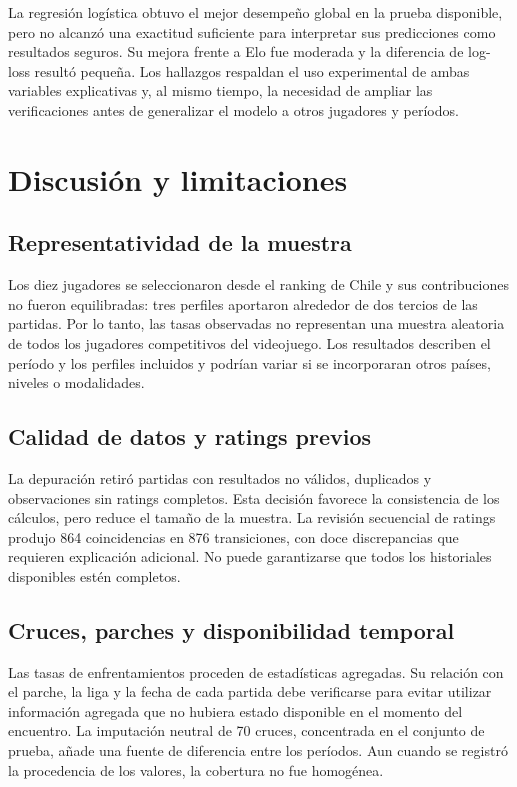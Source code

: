 \documentclass[12pt,a4paper]{article}
\begin{document}
La regresión logística obtuvo el mejor desempeño global en la prueba disponible, pero no alcanzó una exactitud suficiente para interpretar sus predicciones como resultados seguros. Su mejora frente a Elo fue moderada y la diferencia de log-loss resultó pequeña. Los hallazgos respaldan el uso experimental de ambas variables explicativas y, al mismo tiempo, la necesidad de ampliar las verificaciones antes de generalizar el modelo a otros jugadores y períodos.

\section{Discusión y limitaciones}

\subsection{Representatividad de la muestra}

Los diez jugadores se seleccionaron desde el ranking de Chile y sus contribuciones no fueron equilibradas: tres perfiles aportaron alrededor de dos tercios de las partidas. Por lo tanto, las tasas observadas no representan una muestra aleatoria de todos los jugadores competitivos del videojuego. Los resultados describen el período y los perfiles incluidos y podrían variar si se incorporaran otros países, niveles o modalidades.

\subsection{Calidad de datos y ratings previos}

La depuración retiró partidas con resultados no válidos, duplicados y observaciones sin ratings completos. Esta decisión favorece la consistencia de los cálculos, pero reduce el tamaño de la muestra. La revisión secuencial de ratings produjo 864 coincidencias en 876 transiciones, con doce discrepancias que requieren explicación adicional. No puede garantizarse que todos los historiales disponibles estén completos.

\subsection{Cruces, parches y disponibilidad temporal}

Las tasas de enfrentamientos proceden de estadísticas agregadas. Su relación con el parche, la liga y la fecha de cada partida debe verificarse para evitar utilizar información agregada que no hubiera estado disponible en el momento del encuentro. La imputación neutral de 70 cruces, concentrada en el conjunto de prueba, añade una fuente de diferencia entre los períodos. Aun cuando se registró la procedencia de los valores, la cobertura no fue homogénea.
\end{document}
